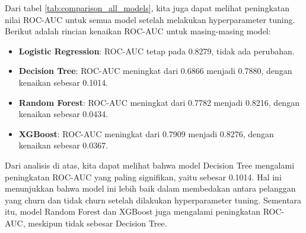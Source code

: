 Dari tabel \ref{tab:comparison_all_models}, kita juga dapat melihat peningkatan nilai ROC-AUC untuk semua model setelah melakukan hyperparameter tuning. Berikut adalah rincian kenaikan ROC-AUC untuk masing-masing model:
\begin{itemize}
    \item \textbf{Logistic Regression}: ROC-AUC tetap pada 0.8279, tidak ada perubahan.
    \item \textbf{Decision Tree}: ROC-AUC meningkat dari 0.6866 menjadi 0.7880, dengan kenaikan sebesar 0.1014.
    \item \textbf{Random Forest}: ROC-AUC meningkat dari 0.7782 menjadi 0.8216, dengan kenaikan sebesar 0.0434.
    \item \textbf{XGBoost}: ROC-AUC meningkat dari 0.7909 menjadi 0.8276, dengan kenaikan sebesar 0.0367.
\end{itemize}
Dari analisis di atas, kita dapat melihat bahwa model Decision Tree mengalami peningkatan ROC-AUC yang paling signifikan, yaitu sebesar 0.1014. Hal ini menunjukkan bahwa model ini lebih baik dalam membedakan antara pelanggan yang churn dan tidak churn setelah dilakukan hyperparameter tuning. Sementara itu, model Random Forest dan XGBoost juga mengalami peningkatan ROC-AUC, meskipun tidak sebesar Decision Tree.

